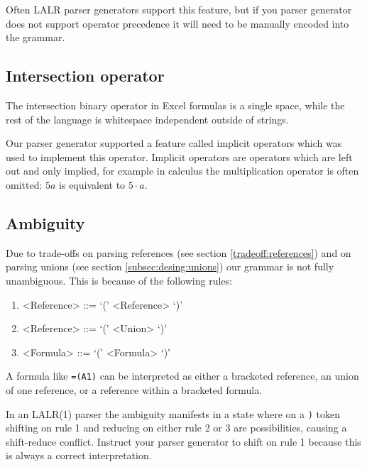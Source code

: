 \documentclass[conference]{IEEEtran}
\begin{document}
Often LALR parser generators support this feature, but if you parser generator does not support operator precedence it will need to be manually encoded into the grammar.

\subsection{Intersection operator}

The intersection binary operator in Excel formulas is a single space, while the rest of the language is whitespace independent outside of strings.

Our parser generator supported a feature called implicit operators which was used to implement this operator.
Implicit operators are operators which are left out and only implied, for example in calculus the multiplication operator is often omitted: $5a$ is equivalent to $5 \cdot a$.

\subsection{Ambiguity}
\label{sec:ambiguity}

Due to trade-offs on parsing references (see section \ref{tradeoff:references}) and on parsing unions (see section \ref{subsec:desing:unions}) our grammar is not fully unambiguous.
This is because of the following rules:
\begin{enumerate}
\item \begin{grammar}<Reference> ::= `(' <Reference> `)'\end{grammar}
\item \begin{grammar}<Reference> ::= `(' <Union> `)'\end{grammar}
\item \begin{grammar}<Formula> ::= `(' <Formula> `)'\end{grammar}
\end{enumerate}

A formula like \texttt{=(A1)} can be interpreted as either a bracketed reference, an union of one reference, or a reference within a bracketed formula.

In an LALR(1) parser the ambiguity manifests in a state where on a \texttt{)} token shifting on rule 1 and reducing on either rule 2 or 3 are possibilities, causing a shift-reduce conflict.
Instruct your parser generator to shift on rule 1 because this is always a correct interpretation.
\end{document}

